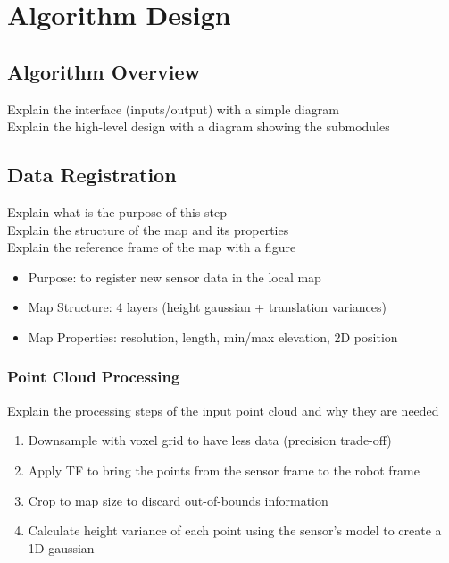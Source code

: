 \label{Chapter2}

\chapter{Algorithm Design}

\section{Algorithm Overview}

Explain the interface (inputs/output) with a simple diagram\\
Explain the high-level design with a diagram showing the submodules

\section{Data Registration}

Explain what is the purpose of this step\\
Explain the structure of the map and its properties\\
Explain the reference frame of the map with a figure

\begin{itemize}
    \item Purpose: to register new sensor data in the local map
    \item Map Structure: 4 layers (height gaussian + translation variances)
    \item Map Properties: resolution, length, min/max elevation, 2D position
\end{itemize}

\subsection{Point Cloud Processing}

Explain the processing steps of the input point cloud and why they are needed

\begin{enumerate}
    \item Downsample with voxel grid to have less data (precision trade-off)
    \item Apply TF to bring the points from the sensor frame to the robot frame
    \item Crop to map size to discard out-of-bounds information
    \item Calculate height variance of each point using the sensor's model to create a 1D gaussian
\end{enumerate}

